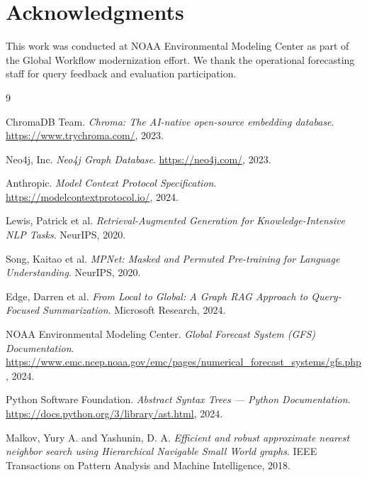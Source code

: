 \documentclass[11pt,letterpaper]{article}
\begin{document}
\section*{Acknowledgments}

This work was conducted at NOAA Environmental Modeling Center as part of the Global Workflow modernization effort. We thank the operational forecasting staff for query feedback and evaluation participation.


\begin{thebibliography}{9}

ChromaDB Team.
\textit{Chroma: The AI-native open-source embedding database}.
\url{https://www.trychroma.com/}, 2023.

Neo4j, Inc.
\textit{Neo4j Graph Database}.
\url{https://neo4j.com/}, 2023.

Anthropic.
\textit{Model Context Protocol Specification}.
\url{https://modelcontextprotocol.io/}, 2024.

Lewis, Patrick et al.
\textit{Retrieval-Augmented Generation for Knowledge-Intensive NLP Tasks}.
NeurIPS, 2020.

Song, Kaitao et al.
\textit{MPNet: Masked and Permuted Pre-training for Language Understanding}.
NeurIPS, 2020.

Edge, Darren et al.
\textit{From Local to Global: A Graph RAG Approach to Query-Focused Summarization}.
Microsoft Research, 2024.

NOAA Environmental Modeling Center.
\textit{Global Forecast System (GFS) Documentation}.
\url{https://www.emc.ncep.noaa.gov/emc/pages/numerical_forecast_systems/gfs.php}, 2024.

Python Software Foundation.
\textit{Abstract Syntax Trees — Python Documentation}.
\url{https://docs.python.org/3/library/ast.html}, 2024.

Malkov, Yury A. and Yashunin, D. A.
\textit{Efficient and robust approximate nearest neighbor search using Hierarchical Navigable Small World graphs}.
IEEE Transactions on Pattern Analysis and Machine Intelligence, 2018.

\end{thebibliography}

\appendix
\end{document}

